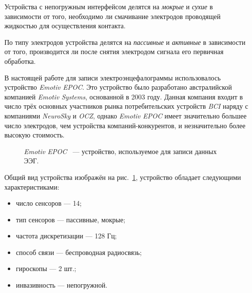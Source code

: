 \documentclass[12pt,a4paper,oneside,fleqn,leqno]{article}
\begin{document}
	\par Устройства с непогружным интерфейсом делятся на {\it мокрые} и {\it сухие} в зависимости от того, необходимо ли смачивание электродов проводящей жидкостью для осуществления контакта.
	\par По типу электродов устройства делятся на {\it пассивные} и {\it активные} в зависимости от того, производится ли после снятия электродом сигнала его первичная обработка.

	
	\par В настоящей работе для записи электроэнцефалограммы использовалось устройство {\it Emotiv EPOC}. Это устройство было разработано австралийской компанией {\it Emotiv Systems}, основанной в 2003 году. Данная компания входит в число трёх основных участников рынка потребительских устройств {\it BCI} наряду с компаниями {\it NeuroSky} и {\it OCZ}, однако {\it Emotiv EPOC} имеет значительно большее число электродов, чем устройства компаний-конкурентов, и незначительно более высокую стоимость. 
\begin{figure}[h!]
\caption{{\it Emotiv EPOC} ~--- устройство, используемое для записи данных ЭЭГ.}
\label{Emotiv}
\end{figure}

	\par Общий вид устройства изображён на рис.~\ref{Emotiv}, устройство обладает следующими характеристиками:
	\begin{itemize}\itemsep0pt
	\item
	число сенсоров — 14;
	\item
	тип сенсоров — пассивные, мокрые;
	\item
	частота дискретизации — 128 Гц;
	\item
	способ связи — беспроводная радиосвязь;
	\item
	гироскопы — 2 шт.;
	\item
	инвазивность — непогружной.
	\end{itemize}
\end{document}
